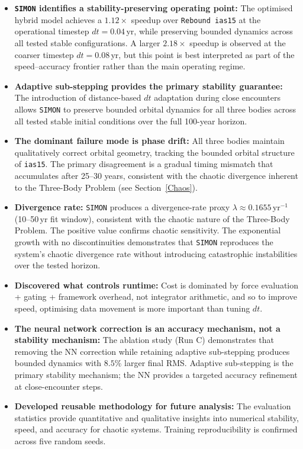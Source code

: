 \documentclass[12pt]{article}
\begin{document}
\begin{itemize}
    \item \textbf{\texttt{SIMON} identifies a stability-preserving operating point:} The optimised hybrid model achieves a $1.12\times$ speedup over \texttt{Rebound ias15} at the operational timestep $dt = 0.04$\,yr, while preserving bounded dynamics across all tested stable configurations. A larger $2.18\times$ speedup is observed at the coarser timestep $dt = 0.08$\,yr, but this point is best interpreted as part of the speed--accuracy frontier rather than the main operating regime.
    
    \item \textbf{Adaptive sub-stepping provides the primary stability guarantee:} The introduction of distance-based $dt$ adaptation during close encounters allows \texttt{SIMON} to preserve bounded orbital dynamics for all three bodies across all tested stable initial conditions over the full 100-year horizon.
    \item \textbf{The dominant failure mode is phase drift:} All three bodies maintain qualitatively correct orbital geometry, tracking the bounded orbital structure of \texttt{ias15}. The primary disagreement is a gradual timing mismatch that accumulates after 25--30 years, consistent with the chaotic divergence inherent to the Three-Body Problem (see Section~\ref{Chaos}).
    \item \textbf{Divergence rate:} \texttt{SIMON} produces a divergence-rate proxy $\lambda \approx 0.1655$\,yr$^{-1}$ (10--50\,yr fit window), consistent with the chaotic nature of the Three-Body Problem. The positive value confirms chaotic sensitivity. The exponential growth with no discontinuities demonstrates that \texttt{SIMON} reproduces the system's chaotic divergence rate without introducing catastrophic instabilities over the tested horizon.
    \item \textbf{Discovered what controls runtime:} Cost is dominated by force evaluation + gating + framework overhead, not integrator arithmetic, and so to improve speed, optimising data movement is more important than tuning $dt$.
    \item \textbf{The neural network correction is an accuracy mechanism, not a stability mechanism:} The ablation study (Run C) demonstrates that removing the NN correction while retaining adaptive sub-stepping produces bounded dynamics with $8.5\%$ larger final RMS. Adaptive sub-stepping is the primary stability mechanism; the NN provides a targeted accuracy refinement at close-encounter steps.
    \item \textbf{Developed reusable methodology for future analysis:} The evaluation statistics provide quantitative and qualitative insights into numerical stability, speed, and accuracy for chaotic systems. Training reproducibility is confirmed across five random seeds.
\end{itemize}
\end{document}
